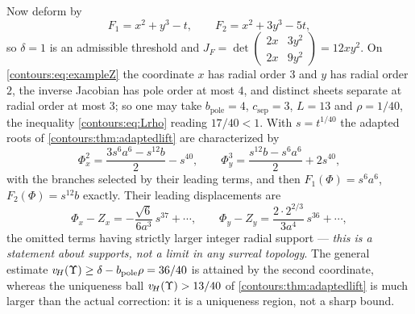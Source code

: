 \documentclass[11pt,letterpaper]{article}
\theoremstyle{definition}
\theoremstyle{remark}
\numberwithin{equation}{section}
\begin{document}
\begin{example}
Now deform by
\begin{equation}\label{contours:eq:exampleF}
  F_1=x^2+y^3-t,\qquad F_2=x^2+3y^3-5t,
\end{equation}
so $\delta=1$ is an admissible threshold and
$J_F=\det\left(\begin{smallmatrix}2x&3y^2\\2x&9y^2\end{smallmatrix}\right)
=12xy^2$. On \eqref{contours:eq:exampleZ} the coordinate $x$ has radial order
$3$ and $y$ has radial order $2$, the inverse Jacobian has pole order at most
$4$, and distinct sheets separate at radial order at most $3$; so one may take
$b_{\mathrm{pole}}=4$, $c_{\mathrm{sep}}=3$, $L=13$ and $\rho=1/40$, the
inequality \eqref{contours:eq:Lrho} reading $17/40<1$. With $s=t^{1/40}$ the
adapted roots of \cref{contours:thm:adaptedlift} are characterized by
\begin{equation}\label{contours:eq:examplePhi}
  \Phi_x^2=\frac{3s^6a^6-s^{12}b}{2}-s^{40},
  \qquad
  \Phi_y^3=\frac{s^{12}b-s^6a^6}{2}+2s^{40},
\end{equation}
with the branches selected by their leading terms, and then
$F_1(\Phi)=s^6a^6$, $F_2(\Phi)=s^{12}b$ exactly. Their leading displacements are
\[
  \Phi_x-Z_x=-\frac{\sqrt6}{6a^3}\,s^{37}+\cdots,
  \qquad
  \Phi_y-Z_y=\frac{2\cdot2^{2/3}}{3a^4}\,s^{36}+\cdots,
\]
the omitted terms having strictly larger integer radial support --- \emph{this
is a statement about supports, not a limit in any surreal topology}. The general
estimate $v_{\!H}(\Upsilon)\ge\delta-b_{\mathrm{pole}}\rho=36/40$ is attained by the
second coordinate, whereas the uniqueness ball $v_{\!H}(\Upsilon)>13/40$ of
\cref{contours:thm:adaptedlift} is much larger than the actual correction: it is
a uniqueness region, not a sharp bound.


\end{example}
\end{document}
